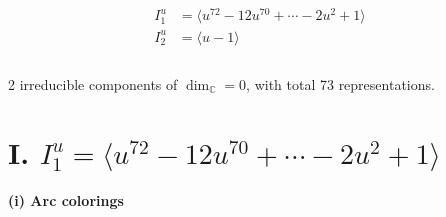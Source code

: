 \documentclass[1p]{elsarticle_modified}
\theoremstyle{definition}
\begin{document}
\begin{align*}
I^u_{1}&=\langle 
u^{72}-12 u^{70}+\cdots-2 u^2+1\rangle \\
I^u_{2}&=\langle 
u-1\rangle \\
\\
\end{align*}
\raggedright * 2 irreducible components of $\dim_{\mathbb{C}}=0$, with total 73 representations.\\
\newpage
\renewcommand{\arraystretch}{1}
\centering \section*{I. $I^u_{1}= \langle u^{72}-12 u^{70}+\cdots-2 u^2+1 \rangle$}
\flushleft \textbf{(i) Arc colorings}\\
\end{document}
